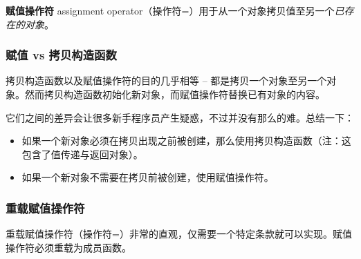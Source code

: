 \documentclass[../../LearnCpp.tex]{subfiles}
\begin{document}

\textbf{赋值操作符} assignment operator（操作符=）用于从一个对象拷贝值至另一个\textit{已存在的对象}。

\subsubsection*{赋值 vs 拷贝构造函数}

拷贝构造函数以及赋值操作符的目的几乎相等 -- 都是拷贝一个对象至另一个对象。然而拷贝构造函数初始化新对象，而赋值操作符替换已有对象的内容。

它们之间的差异会让很多新手程序员产生疑惑，不过并没有那么的难。总结一下：

\begin{itemize}
  \item 如果一个新对象必须在拷贝出现之前被创建，那么使用拷贝构造函数（注：这包含了值传递与返回对象）。
  \item 如果一个新对象不需要在拷贝前被创建，使用赋值操作符。
\end{itemize}

\subsubsection*{重载赋值操作符}

重载赋值操作符（操作符=）非常的直观，仅需要一个特定条款就可以实现。赋值操作符必须重载为成员函数。
\end{document}
